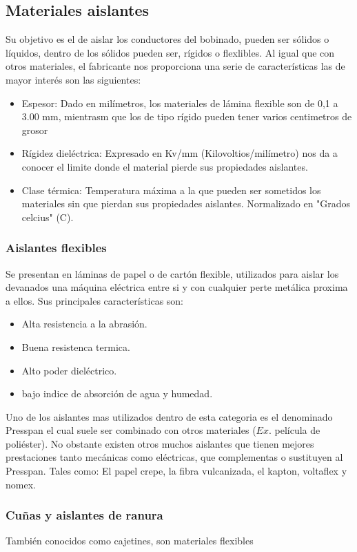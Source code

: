 \documentclass{report}
\begin{document}
    \subsection{Materiales aislantes}\label{ssec:materiales_aislantes}
      Su objetivo es el de aislar los conductores del bobinado, pueden ser sólidos o líquidos, dentro de los sólidos pueden ser,
      rígidos o flexlibles.
      \fspace{1em}
      Al igual que con otros materiales, el fabricante nos proporciona una serie de características las de mayor interés son las siguientes:
      \begin{itemize}

        \item{Espesor:} Dado en milímetros, los materiales de lámina flexible son de 0,1 a 3.00 mm,
          mientrasm que los de tipo rígido pueden tener varios centimetros de grosor

        \item{Rígidez dieléctrica:} Expresado en Kv/mm (Kilovoltios/milímetro) nos da a conocer el limite donde el material pierde
          sus propiedades aislantes.

        \item{Clase térmica:} Temperatura máxima a la que pueden ser sometidos los materiales sin que pierdan sus propiedades 
          aislantes. Normalizado en "Grados celcius" (C).

      \end{itemize}
        \subsubsection{Aislantes flexibles}\label{sssec:aislantes_flexibles}
          Se presentan en láminas de papel o de cartón flexible, utilizados para aislar los devanados una máquina eléctrica
          entre si y con cualquier perte metálica proxima a ellos. Sus principales características son:


          \begin{itemize}
            \item{} Alta resistencia a la abrasión.
            \item{} Buena resistenca termica.
            \item{} Alto poder dieléctrico. \item{} bajo indice de absorción de agua y humedad.
          \end{itemize}
          \vspace{1em}
          Uno de los aislantes mas utilizados dentro de esta categoria es el denominado Presspan el cual suele ser combinado con 
          otros materiales ($Ex.$ película de poliéster). No obstante existen otros muchos aislantes que tienen mejores 
          prestaciones tanto mecánicas como eléctricas, que complementas o sustituyen al Presspan. Tales como: 
          El papel crepe, la fibra vulcanizada, el kapton, voltaflex y nomex.

        \subsubsection{Cuñas y aislantes de ranura}\label{sssec:cuñas_y_aislantes_ranura}
          También conocidos como cajetines, son materiales flexibles     
\end{document}
